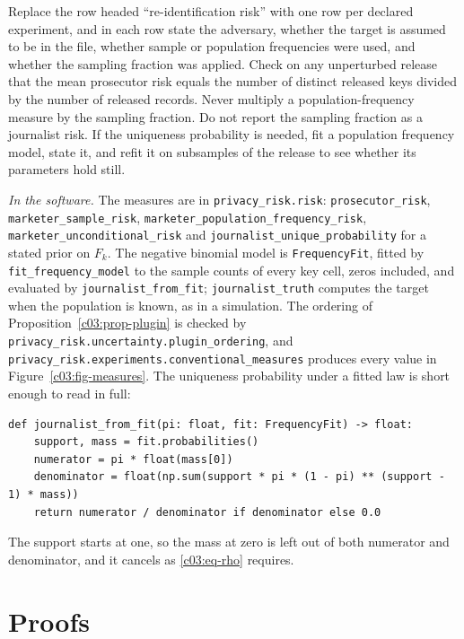 \begin{inpractice}\sloppy
Replace the row headed ``re-identification risk'' with one row per declared experiment,
and in each row state the adversary, whether the target is assumed to be in the file,
whether sample or population frequencies were used, and whether the sampling fraction
was applied. Check on any unperturbed release that the mean prosecutor risk equals the
number of distinct released keys divided by the number of released records. Never
multiply a population-frequency measure by the sampling fraction. Do not report the
sampling fraction as a journalist risk. If the uniqueness probability is needed, fit a
population frequency model, state it, and refit it on subsamples of the release to see
whether its parameters hold still.

\smallskip\noindent\textit{In the software.} The measures are in
\texttt{privacy\_risk.risk}: \texttt{prosecutor\_risk}, \texttt{marketer\_sample\_risk},
\texttt{marketer\_population\_frequency\_risk}, \texttt{marketer\_unconditional\_risk}
and \texttt{journalist\_unique\_probability} for a stated prior on $F_k$. The negative
binomial model is \texttt{FrequencyFit}, fitted by \texttt{fit\_frequency\_model} to the
sample counts of every key cell, zeros included, and evaluated by
\texttt{journalist\_from\_fit}; \texttt{journalist\_truth} computes the target when the
population is known, as in a simulation. The ordering of
Proposition~\ref{c03:prop-plugin} is checked by
\texttt{privacy\_risk.uncertainty.plugin\_ordering}, and
\texttt{privacy\_risk.experiments.conventional\_measures} produces every value in
Figure~\ref{c03:fig-measures}. The uniqueness probability under a fitted law is short
enough to read in full:
\begin{lstlisting}
def journalist_from_fit(pi: float, fit: FrequencyFit) -> float:
    support, mass = fit.probabilities()
    numerator = pi * float(mass[0])
    denominator = float(np.sum(support * pi * (1 - pi) ** (support - 1) * mass))
    return numerator / denominator if denominator else 0.0
\end{lstlisting}
The support starts at one, so the mass at zero is left out of both numerator and
denominator, and it cancels as \eqref{c03:eq-rho} requires.
\end{inpractice}

\section{Proofs}

